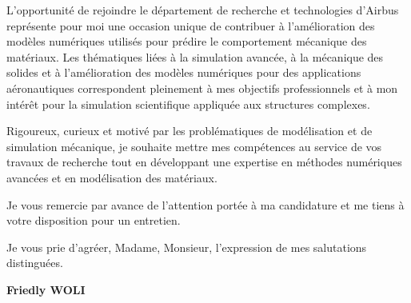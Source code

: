 \documentclass[11pt,a4paper]{article}
\begin{document}
L’opportunité de rejoindre le département de recherche et technologies d’Airbus représente pour moi une occasion unique de contribuer à l’amélioration des modèles numériques utilisés pour prédire le comportement mécanique des matériaux. Les thématiques liées à la simulation avancée, à la mécanique des solides et à l’amélioration des modèles numériques pour des applications aéronautiques correspondent pleinement à mes objectifs professionnels et à mon intérêt pour la simulation scientifique appliquée aux structures complexes.

Rigoureux, curieux et motivé par les problématiques de modélisation et de simulation mécanique, je souhaite mettre mes compétences au service de vos travaux de recherche tout en développant une expertise en méthodes numériques avancées et en modélisation des matériaux.

Je vous remercie par avance de l’attention portée à ma candidature et me tiens à votre disposition pour un entretien.

Je vous prie d’agréer, Madame, Monsieur, l’expression de mes salutations distinguées.
	\vspace{1cm}
	
	\begin{flushright}
		\textbf{Friedly WOLI}
	\end{flushright}
	
\end{document}
